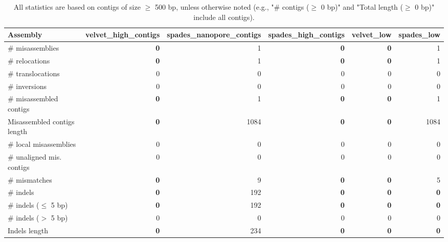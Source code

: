 \documentclass[12pt,a4paper]{article}
\begin{document}
\begin{table}[ht]
\begin{center}
\caption{All statistics are based on contigs of size $\geq$ 500 bp, unless otherwise noted (e.g., "\# contigs ($\geq$ 0 bp)" and "Total length ($\geq$ 0 bp)" include all contigs).}
\begin{tabular}{|l*{5}{|r}|}
\hline
Assembly & velvet\_high\_contigs & spades\_nanopore\_contigs & spades\_high\_contigs & velvet\_low & spades\_low \\ \hline
\# misassemblies & {\bf 0} & 1 & {\bf 0} & {\bf 0} & 1 \\ \hline
\hspace{5mm}\# relocations & {\bf 0} & 1 & {\bf 0} & {\bf 0} & 1 \\ \hline
\hspace{5mm}\# translocations & 0 & 0 & 0 & 0 & 0 \\ \hline
\hspace{5mm}\# inversions & 0 & 0 & 0 & 0 & 0 \\ \hline
\# misassembled contigs & {\bf 0} & 1 & {\bf 0} & {\bf 0} & 1 \\ \hline
Misassembled contigs length & {\bf 0} & 1084 & {\bf 0} & {\bf 0} & 1084 \\ \hline
\# local misassemblies & 0 & 0 & 0 & 0 & 0 \\ \hline
\# unaligned mis. contigs & 0 & 0 & 0 & 0 & 0 \\ \hline
\# mismatches & {\bf 0} & 9 & {\bf 0} & {\bf 0} & 5 \\ \hline
\# indels & {\bf 0} & 192 & {\bf 0} & {\bf 0} & {\bf 0} \\ \hline
\hspace{5mm}\# indels ($\leq$ 5 bp) & {\bf 0} & 192 & {\bf 0} & {\bf 0} & {\bf 0} \\ \hline
\hspace{5mm}\# indels ($>$ 5 bp) & 0 & 0 & 0 & 0 & 0 \\ \hline
Indels length & {\bf 0} & 234 & {\bf 0} & {\bf 0} & {\bf 0} \\ \hline
\end{tabular}
\end{center}
\end{table}
\end{document}
